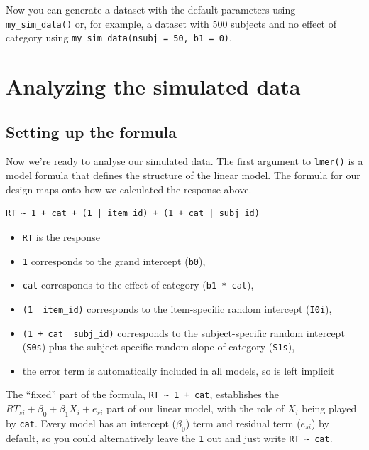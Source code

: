 \documentclass[doc,floatsintext]{apa6}
\newenvironment{Shaded}{\begin{snugshade}}{\end{snugshade}}
\newcommand{\NormalTok}[1]{#1}
\providecommand{\tightlist}{%
  \setlength{\itemsep}{0pt}\setlength{\parskip}{0pt}}
\begin{document}
\begin{Shaded}
\begin{Highlighting}[]
{{{{{\NormalTok{  dat_sim}
\NormalTok{\}}
\end{Highlighting}
\end{Shaded}

Now you can generate a dataset with the default parameters using
\texttt{my\_sim\_data()} or, for example, a dataset with 500 subjects
and no effect of category using
\texttt{my\_sim\_data(nsubj\ =\ 50,\ b1\ =\ 0)}.

\section{Analyzing the simulated
data}\label{analyzing-the-simulated-data}

\subsection{Setting up the formula}\label{setting-up-the-formula}

Now we're ready to analyse our simulated data. The first argument to
\texttt{lmer()} is a model formula that defines the structure of the
linear model. The formula for our design maps onto how we calculated the
response above.

\begin{verbatim}
RT ~ 1 + cat + (1 | item_id) + (1 + cat | subj_id)
\end{verbatim}

\begin{itemize}
\tightlist
\item
  \texttt{RT} is the response
\item
  \texttt{1} corresponds to the grand intercept (\texttt{b0}),
\item
  \texttt{cat} corresponds to the effect of category
  (\texttt{b1\ *\ cat}),
\item
  \texttt{(1\ \textbar{}\ item\_id)} corresponds to the item-specific
  random intercept (\texttt{I0i}),
\item
  \texttt{(1\ +\ cat\ \textbar{}\ subj\_id)} corresponds to the
  subject-specific random intercept (\texttt{S0s}) plus the
  subject-specific random slope of category (\texttt{S1s}),
\item
  the error term is automatically included in all models, so is left
  implicit
\end{itemize}

The \enquote{fixed} part of the formula,
\texttt{RT\ \textasciitilde{}\ 1\ +\ cat}, establishes the
\(RT_{si} + \beta_0 + \beta_1 X_i + e_{si}\) part of our linear model,
with the role of \(X_i\) being played by \texttt{cat}. Every model has
an intercept (\(\beta_0\)) term and residual term (\(e_{si}\)) by
default, so you could alternatively leave the \texttt{1} out and just
write \texttt{RT\ \textasciitilde{}\ cat}.
\end{document}
